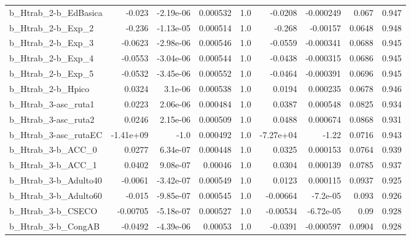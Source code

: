 \begin{tabular}{lrrrrrrrr}
b\_Htrab\_2-b\_EdBasica       &      -0.023 &    -2.19e-06 &  0.000532 &      1.0 &    -0.0208 &   -0.000249 &        0.067 &         0.947 \\
b\_Htrab\_2-b\_Exp\_2          &      -0.236 &    -1.13e-05 &  0.000514 &      1.0 &     -0.268 &    -0.00157 &       0.0648 &         0.948 \\
b\_Htrab\_2-b\_Exp\_3          &     -0.0623 &    -2.98e-06 &  0.000546 &      1.0 &    -0.0559 &   -0.000341 &       0.0688 &         0.945 \\
b\_Htrab\_2-b\_Exp\_4          &     -0.0553 &    -3.04e-06 &  0.000544 &      1.0 &    -0.0438 &   -0.000315 &       0.0686 &         0.945 \\
b\_Htrab\_2-b\_Exp\_5          &     -0.0532 &    -3.45e-06 &  0.000552 &      1.0 &    -0.0464 &   -0.000391 &       0.0696 &         0.945 \\
b\_Htrab\_2-b\_Hpico          &      0.0324 &      3.1e-06 &  0.000538 &      1.0 &     0.0194 &    0.000235 &       0.0678 &         0.946 \\
b\_Htrab\_3-asc\_ruta1        &      0.0223 &     2.06e-06 &  0.000484 &      1.0 &     0.0387 &    0.000548 &       0.0825 &         0.934 \\
b\_Htrab\_3-asc\_ruta2        &      0.0246 &     2.15e-06 &  0.000509 &      1.0 &     0.0488 &    0.000674 &       0.0868 &         0.931 \\
b\_Htrab\_3-asc\_rutaEC       &   -1.41e+09 &         -1.0 &  0.000492 &      1.0 &  -7.27e+04 &       -1.22 &       0.0716 &         0.943 \\
b\_Htrab\_3-b\_ACC\_0          &      0.0277 &     6.34e-07 &  0.000448 &      1.0 &     0.0325 &    0.000153 &       0.0764 &         0.939 \\
b\_Htrab\_3-b\_ACC\_1          &      0.0402 &     9.08e-07 &   0.00046 &      1.0 &     0.0304 &    0.000139 &       0.0785 &         0.937 \\
b\_Htrab\_3-b\_Adulto40       &     -0.0061 &    -3.42e-07 &  0.000549 &      1.0 &     0.0123 &    0.000115 &       0.0937 &         0.925 \\
b\_Htrab\_3-b\_Adulto60       &      -0.015 &    -9.85e-07 &  0.000545 &      1.0 &   -0.00664 &    -7.2e-05 &        0.093 &         0.926 \\
b\_Htrab\_3-b\_CSECO          &    -0.00705 &    -5.18e-07 &  0.000527 &      1.0 &   -0.00534 &   -6.72e-05 &         0.09 &         0.928 \\
b\_Htrab\_3-b\_CongAB         &     -0.0492 &    -4.39e-06 &   0.00053 &      1.0 &    -0.0391 &   -0.000597 &       0.0904 &         0.928 \\

\end{tabular}
